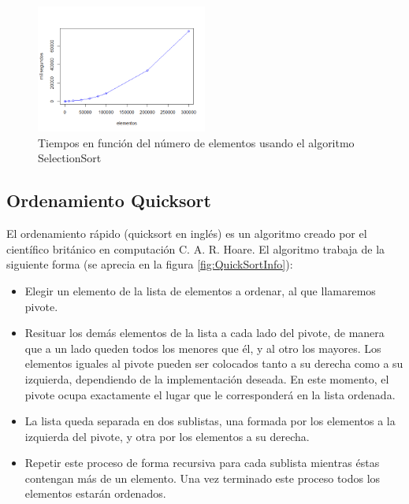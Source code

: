 \documentclass[8pt, A4]{article}    %
\begin{document}
\begin{figure}[h]
\begin{center}
\includegraphics[width=0.5\textwidth]{graph/selectionSortTime}
\end{center}
\caption{Tiempos en función del número de elementos usando el algoritmo SelectionSort}
\label{fig:selectionSortTime}
\end{figure}

\newpage


\subsection{Ordenamiento Quicksort}
El ordenamiento rápido (quicksort en inglés) es un algoritmo creado por el científico británico en computación C. A. R. Hoare.
El algoritmo trabaja de la siguiente forma (se aprecia en la figura \ref{fig:QuickSortInfo}):

\begin{itemize}
    \item Elegir un elemento de la lista de elementos a ordenar, al que llamaremos pivote.
    \item Resituar los demás elementos de la lista a cada lado del pivote, de manera que a un lado queden todos los menores que él, y al otro los mayores. Los elementos iguales al pivote pueden ser colocados tanto a su derecha como a su izquierda, dependiendo de la implementación deseada. En este momento, el pivote ocupa exactamente el lugar que le corresponderá en la lista ordenada.
    \item La lista queda separada en dos sublistas, una formada por los elementos a la izquierda del pivote, y otra por los elementos a su derecha.
    \item Repetir este proceso de forma recursiva para cada sublista mientras éstas contengan más de un elemento. Una vez terminado este proceso todos los elementos estarán ordenados.
\end{itemize}
\end{document}
